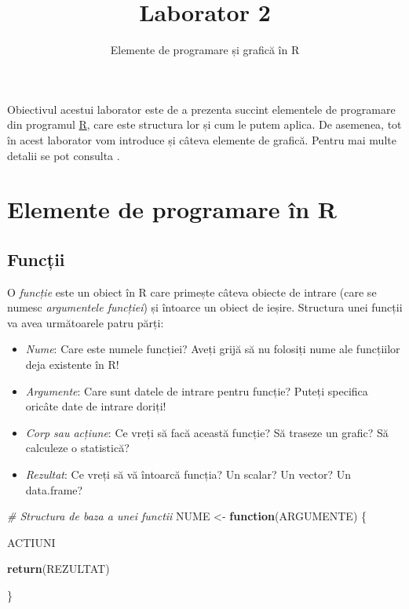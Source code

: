\documentclass[]{article}
\title{Laborator 2}
\subtitle{Elemente de programare și grafică în R}
\author{}
\date{}
\newenvironment{Shaded}{\begin{snugshade}}{\end{snugshade}}
\newcommand{\CommentTok}[1]{\textcolor[rgb]{0.56,0.35,0.01}{\textit{#1}}}
\newcommand{\ControlFlowTok}[1]{\textcolor[rgb]{0.13,0.29,0.53}{\textbf{#1}}}
\newcommand{\KeywordTok}[1]{\textcolor[rgb]{0.13,0.29,0.53}{\textbf{#1}}}
\newcommand{\NormalTok}[1]{#1}
\newcommand{\StringTok}[1]{\textcolor[rgb]{0.31,0.60,0.02}{#1}}
\begin{document}
\maketitle

\thispagestyle{fancy}

Obiectivul acestui laborator este de a prezenta succint elementele de
programare din programul \href{https://cran.r-project.org/}{R}, care
este structura lor și cum le putem aplica. De asemenea, tot în acest
laborator vom introduce și câteva elemente de grafică. Pentru mai multe
detalii se pot consulta \citep[\citet{Matloff2011}]{Davies2016}.

\hypertarget{elemente-de-programare-uxeen-r}{%
\section{Elemente de programare în
R}\label{elemente-de-programare-uxeen-r}}

\hypertarget{funcux21bii}{%
\subsection{Funcții}\label{funcux21bii}}

O \emph{funcție} este un obiect în R care primește câteva obiecte de
intrare (care se numesc \emph{argumentele funcției}) și întoarce un
obiect de ieșire. Structura unei funcții va avea următoarele patru
părți:

\begin{itemize}
\item
  \emph{Nume}: Care este numele funcției? Aveți grijă să nu folosiți
  nume ale funcțiilor deja existente în R!
\item
  \emph{Argumente}: Care sunt datele de intrare pentru funcție? Puteți
  specifica oricâte date de intrare doriți!
\item
  \emph{Corp sau acțiune}: Ce vreți să facă această funcție? Să traseze
  un grafic? Să calculeze o statistică?
\item
  \emph{Rezultat}: Ce vreți să vă întoarcă funcția? Un scalar? Un
  vector? Un data.frame?
\end{itemize}

\begin{Shaded}
\begin{Highlighting}[]
\CommentTok{# Structura de baza a unei functii}
\NormalTok{NUME <-}\StringTok{ }\ControlFlowTok{function}\NormalTok{(ARGUMENTE) \{}

\NormalTok{  ACTIUNI}

  \KeywordTok{return}\NormalTok{(REZULTAT)}

\NormalTok{\}}
\end{Highlighting}
\end{Shaded}
\end{document}

